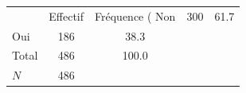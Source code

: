 {
\def\sym#1{\ifmmode^{#1}\else\(^{#1}\)\fi}
\begin{tabular}{l*{1}{cc}}
\toprule
            &    Effectif&Fréquence (%
\midrule
Non         &         300&        61.7\\
Oui         &         186&        38.3\\
Total       &         486&       100.0\\
\midrule
\(N\)       &         486&            \\
\bottomrule
\end{tabular}
}
